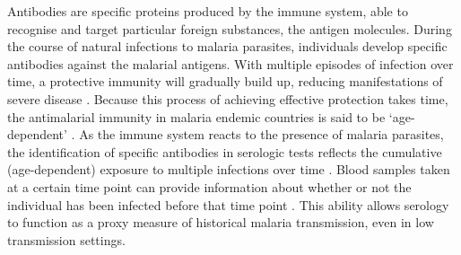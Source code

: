 Antibodies are specific proteins produced by the immune system, able to recognise and target particular foreign substances, the antigen molecules.
During the course of natural infections to malaria parasites, individuals develop specific antibodies against the malarial antigens.
With multiple episodes of infection over time, a protective immunity will gradually build up, reducing manifestations of severe disease \cite{perlmann2002malaria}.
Because this process of achieving effective protection takes time, the antimalarial immunity in malaria endemic countries is said to be `age-dependent' \cite{ondigo2014estimation}.
As the immune system reacts to the presence of malaria parasites, the identification of specific antibodies in serologic tests reflects the cumulative (age-dependent) exposure to multiple infections over time \cite{van2015serology}.
Blood samples taken at a certain time point can provide information about whether or not the individual has been infected before that time point \cite{hens2012modeling}.
This ability allows serology to function as a proxy measure of historical malaria transmission, even in low transmission settings.



